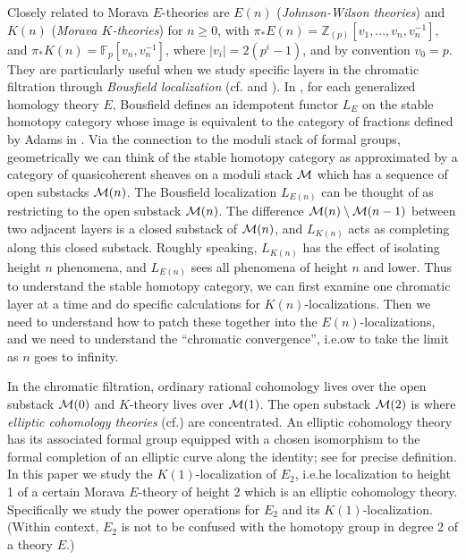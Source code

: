 \documentclass{gtpart}
\theoremstyle{definition}
\theoremstyle{remark}
\newcommand{\mb}[1]{\mathbb{#1}}
\newcommand{\cf}[1]{cf.\thinspace{\cite{#1}}}
\newcommand{\cff}[2]{cf.\thinspace{\cite[#1]{#2}}}
\begin{document}
Closely related to Morava $E$-theories are $E(n)$ ({\em Johnson-Wilson 
theories}) and $K(n)$ ({\em Morava $K$-theories}) for $n \ge 0$, with 
$\pi_*E(n) = {\mb Z}_{(p)}[v_1,...,v_n,v_n^{-1}]$, and 
$\pi_*K(n) = {\mb F}_p[v_n,v_n^{-1}]$, where $|v_i| = 2(p^i-1)$, and by 
convention $v_0 = p$.  They are particularly useful when we study specific 
layers in the chromatic filtration through {\em Bousfield localization} 
(\cff{chapter 7}{orange} and \cite[lectures 20--23]{252x}).  In 
\cite{bousfield}, for each generalized homology theory $E$, Bousfield defines 
an idempotent functor $L_E$ on the stable homotopy category whose image is 
equivalent to the category of fractions defined by Adams in 
\cite[section III.14]{sh}.  Via the connection to the moduli stack of formal 
groups, geometrically we can think of the stable homotopy category as 
approximated by a category of quasicoherent sheaves on a moduli stack $\cal M$ 
which has a sequence of open substacks ${\cal M}(n)$.  The Bousfield 
localization $L_{E(n)}$ can be thought of as restricting to the open substack 
${\cal M}(n)$.  The difference ${\cal M}(n) \setminus {\cal M}(n-1)$ between 
two adjacent layers is a closed substack of ${\cal M}(n)$, and $L_{K(n)}$ acts 
as completing along this closed substack.  Roughly speaking, $L_{K(n)}$ has 
the effect of isolating height $n$ phenomena, and $L_{E(n)}$ sees all 
phenomena of height $n$ and lower.  Thus to understand the stable homotopy 
category, we can first examine one chromatic layer at a time and do specific 
calculations for $K(n)$-localizations.  Then we need to understand how to 
patch these together into the $E(n)$-localizations, and we need to understand 
the ``chromatic convergence'', i.e.ow to take the limit as $n$ 
goes to infinity.  

In the chromatic filtration, ordinary rational cohomology lives over the open 
substack ${\cal M}(0)$ and $K$-theory lives over ${\cal M}(1)$.  The open 
substack ${\cal M}(2)$ is where {\em elliptic cohomology theories} 
(\cf{survey}) are concentrated.  An elliptic cohomology theory has its 
associated formal group equipped with a chosen isomorphism to the formal 
completion of an elliptic curve along the identity; see 
\cite[definition 1.2]{survey} for precise definition.  In this paper we study 
the $K(1)$-localization of $E_2$, i.e.he localization to height 1 
of a certain Morava $E$-theory of height 2 which is an elliptic cohomology 
theory.  Specifically we study the power operations for $E_2$ and its 
$K(1)$-localization.  (Within context, $E_2$ is not to be confused with the 
homotopy group in degree 2 of a theory $E$.)  
\end{document}
